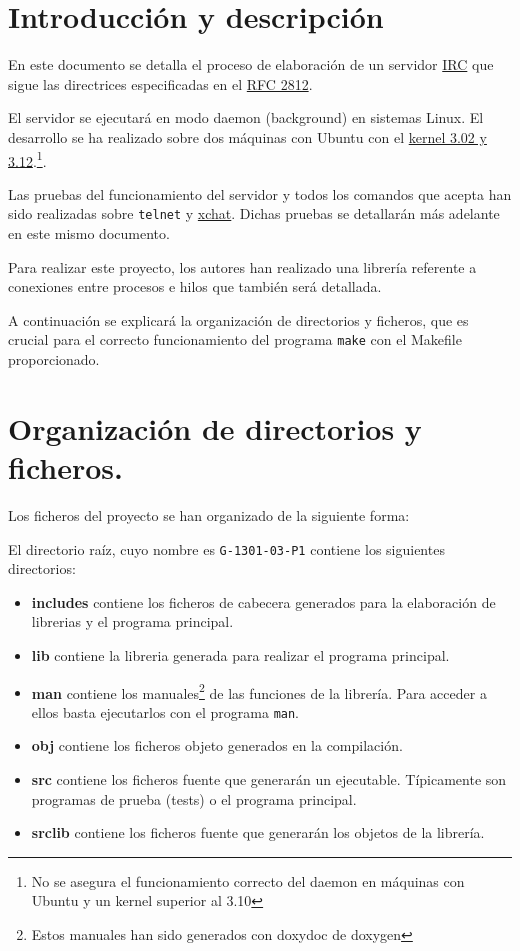 \documentclass{mathnotes}
\title{\thetitle}
\author{\theauthor}
\date{Curso 2013 - 2014\\Universidad Autónoma de Madrid}
\begin{document}
\section{Introducción y descripción}
En este documento se detalla el proceso de elaboración de un servidor \href{http://es.wikipedia.org/wiki/Internet_Relay_Chat}{IRC} que sigue las directrices especificadas en el \href{https://tools.ietf.org/html/rfc2812}{RFC 2812}.

El servidor se ejecutará en modo daemon (background) en sistemas Linux. El desarrollo se ha realizado sobre dos máquinas con Ubuntu con el  \href{https://wiki.ubuntu.com/Kernel/Release} {kernel 3.02 y 3.12}.\footnote{No se asegura el funcionamiento correcto del daemon en máquinas con Ubuntu y un kernel superior al 3.10}.

Las pruebas del funcionamiento del servidor y todos los comandos que acepta han sido realizadas sobre \texttt{telnet} y \href{http://xchat.org/}{xchat}. Dichas pruebas se detallarán más adelante en este mismo documento.

Para realizar este proyecto, los autores han realizado una librería referente a conexiones entre procesos e hilos que también será detallada.

A continuación se explicará la organización de directorios y ficheros, que es crucial para el correcto funcionamiento del programa \texttt{make} con el Makefile proporcionado. 

\section{Organización de directorios y ficheros.}
Los ficheros del proyecto se han organizado de la siguiente forma:

El directorio raíz, cuyo nombre es \texttt{G-1301-03-P1} contiene los siguientes directorios:

\begin{itemize}
\item \textbf{includes} contiene los ficheros de cabecera generados para la elaboración de librerias y el programa principal.

\item \textbf{lib} contiene la libreria generada para realizar el programa principal.

\item \textbf{man} contiene los manuales\footnote{Estos manuales han sido generados con doxydoc de doxygen} de las funciones de la librería. Para acceder a ellos basta ejecutarlos con el programa \texttt{man}.

\item \textbf{obj} contiene los ficheros objeto generados en la compilación.

\item \textbf{src} contiene los ficheros fuente que generarán un ejecutable. Típicamente son programas de prueba (tests) o el programa principal.

\item \textbf{srclib} contiene los ficheros fuente que generarán los objetos de la librería.
\end{itemize}
\end{document}
